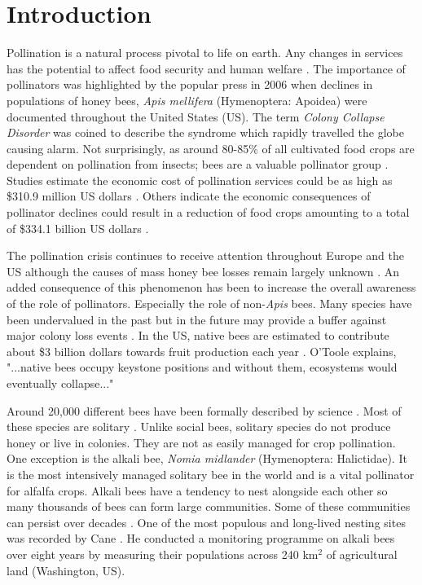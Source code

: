 \chapter{Introduction}\label{ch:introduction}
Pollination is a natural process pivotal to life on earth. Any changes in services has the potential to affect food security and human welfare \cite{Kearns1998}. The importance of {pollinators} was highlighted by the popular press in 2006 when {declines} in populations of honey bees, \emph{Apis mellifera} (Hymenoptera: Apoidea) were documented throughout the United States (US). The term \emph{Colony Collapse Disorder} was coined to describe the syndrome which rapidly travelled the globe causing alarm. Not surprisingly, as around 80-85\% of all cultivated food crops are dependent on pollination from insects; bees are a valuable pollinator group \cite{Allsopp2008}. Studies estimate the economic cost of pollination services could be as high as \$310.9 million US dollars \cite{Allsopp2008}. Others indicate the economic consequences of pollinator declines could result in a reduction of food crops amounting to a total of \$334.1 billion US dollars \cite{Bauer2010}.

The pollination crisis continues to receive attention throughout Europe and the US although the causes of mass honey bee losses remain largely unknown \cite{Williams2010}. An added consequence of this phenomenon has been to increase the overall awareness of the role of pollinators. Especially the role of non-\emph{Apis} bees. Many species have been undervalued in the past \cite{Buchmann1997} but in the future may provide a buffer against major colony loss events \cite{NewstromL2013}. In the US, native bees are estimated to contribute about \$3 billion dollars towards fruit production each year \cite{Losey2006}. O'Toole \cite{Otoole2002} explains, "...native bees occupy keystone positions and without them, ecosystems would eventually collapse..." \cite[pg.32]{Otoole2002}

Around 20,000 different bees have been formally described by science \cite{Michener2000}. Most of these species are solitary \cite{Michener2000}. Unlike social bees, solitary species do not produce honey or live in colonies. They are not as easily managed for crop pollination. One exception is the alkali bee, \emph{Nomia midlander} (Hymenoptera: Halictidae). It is the most intensively managed solitary bee in the world and is a vital pollinator for alfalfa crops. Alkali bees have a tendency to nest alongside each other so many thousands of bees can form large communities. Some of these communities can persist over decades \cite{Canej2003}. One of the most populous and long-lived nesting sites was recorded by Cane \cite{Cane2008}. He conducted a monitoring programme on alkali bees over eight years by measuring their populations across 240 km$^2$ of agricultural land (Washington, US). 

